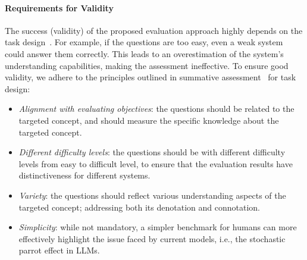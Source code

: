 \paragraph{Requirements for Validity}
The success (validity) of the proposed evaluation approach highly depends on the task design~\cite{black1998assessment,black1998inside}. For example, if the questions are too easy, even a weak system could answer them correctly. This leads to an overestimation of the system's understanding capabilities, making the assessment ineffective. 
To ensure good validity, we adhere to the principles outlined in summative assessment~\cite{black1998assessment,black1998inside} for task design:
\begin{itemize}[noitemsep,nolistsep,leftmargin=*]
    \item \emph{Alignment with evaluating objectives}: the questions should be related to the targeted concept, and should measure the specific knowledge about the targeted concept. 
    \item \emph{Different difficulty levels}: the questions should be with different difficulty levels from easy to difficult level,  to ensure that the evaluation results have distinctiveness for different systems.
    \item \emph{Variety}: the questions should reflect various understanding aspects of the targeted concept; addressing both its denotation and connotation.
    \item \emph{Simplicity}: while not mandatory, a simpler benchmark for humans can more effectively highlight the issue faced by current models, i.e., the stochastic parrot effect in LLMs.
\end{itemize}



